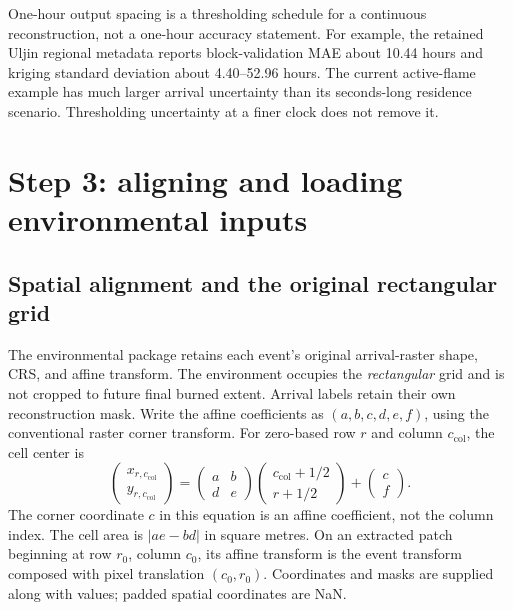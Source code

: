 \documentclass[11pt,a4paper]{article}
\begin{document}
One-hour output spacing is a thresholding schedule for a continuous
reconstruction, not a one-hour accuracy statement. For example, the retained
Uljin regional metadata reports block-validation MAE about 10.44 hours and
kriging standard deviation about 4.40--52.96 hours. The current active-flame
example has much larger arrival uncertainty than its seconds-long residence
scenario. Thresholding uncertainty at a finer clock does not remove it.

\section{Step 3: aligning and loading environmental inputs}
\label{sec:environment}
\subsection{Spatial alignment and the original rectangular grid}
The environmental package retains each event's original arrival-raster shape,
CRS, and affine transform. The environment occupies the \emph{rectangular}
grid and is not cropped to future final burned extent. Arrival labels retain
their own reconstruction mask. Write the affine coefficients as
$(a,b,c,d,e,f)$, using the conventional raster corner transform. For zero-based
row $r$ and column $c_{\mathrm{col}}$, the cell center is
\begin{equation}
\begin{pmatrix}x_{r,c_{\mathrm{col}}}\\y_{r,c_{\mathrm{col}}}\end{pmatrix}
=\begin{pmatrix}a&b\\d&e\end{pmatrix}
\begin{pmatrix}c_{\mathrm{col}}+1/2\\r+1/2\end{pmatrix}
+\begin{pmatrix}c\\f\end{pmatrix}.
\end{equation}
The corner coordinate $c$ in this equation is an affine coefficient, not the
column index. The cell area is $|ae-bd|$ in square metres. On an extracted
patch beginning at row $r_0$, column $c_0$, its affine transform is the event
transform composed with pixel translation $(c_0,r_0)$. Coordinates and masks
are supplied along with values; padded spatial coordinates are NaN.
\end{document}
